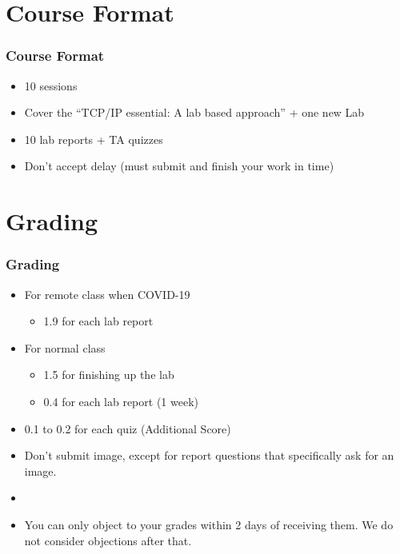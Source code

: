 \documentclass[15pt]{beamer}
\begin{document}
\section{Course Format}
\begin{frame}
    \frametitle{Course Format}

    \begin{itemize}
        \item 10 sessions
        \item Cover the “TCP/IP essential: A lab based approach” + one new Lab
        \item 10 lab reports + TA quizzes
        \item {\color{red} Don’t accept delay (must submit and finish your work in time)}
    \end{itemize}

\end{frame}

\section{Grading}
\begin{frame}
    \frametitle{Grading}

    \begin{itemize}
        \item For remote class when COVID-19
        \begin{itemize}
            \item {\color{red} 1.9} for each lab report
        \end{itemize}
        \item For normal class
        \begin{itemize}
            \item {\color{red} 1.5} for finishing up the lab
            \item {\color{red} 0.4} for each lab report (1 week)
        \end{itemize}
        \item {\color{red} 0.1} to {\color{red} 0.2} for each quiz (Additional Score)
        \item Don’t submit image, except for report questions that specifically ask for an image.
        \item 
        \item You can only object to your grades within {\color{red} 2 days} of receiving them. We do not consider objections after that. 
        
    \end{itemize}

\end{frame}
\end{document}
